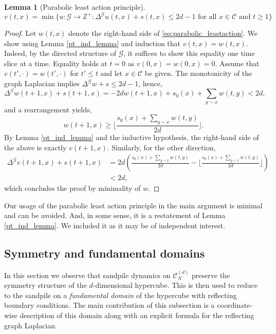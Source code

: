 \documentclass[12pt]{amsart}
\newtheorem{lemma}[theorem]{Lemma}
\begin{document}
	
	
	
	\begin{lemma}[Parabolic least action principle] \label{parabolic_comparison}
		\begin{equation} \label{eq:parabolic_leastaction}
		v(t,x) = \min\{ u: \mathcal{G} \to \mathbb{Z}^+: \Delta^{\mathcal{G}} u(t,x) + s(t,x) \leq 2d-1 \mbox{ for all $x \in \mathcal{C}$ and $t \geq 1$} \}
		\end{equation}
	\end{lemma}
	\begin{proof}
		Let $w(t,x)$ denote the right-hand side of \eqref{eq:parabolic_leastaction}. We show using Lemma \ref{pt_ind_lemma} and induction that $v(t,x) = w(t,x)$. Indeed, by the directed structure of $\mathcal{G}$, it suffices to show this equality one time slice at a time. Equality holds at $t=0$ as $v(0,x) = w(0,x) = 0$. Assume that $v(t',\cdot) = w(t', \cdot)$ for $t' \leq t$ and let $x \in \mathcal{C}$ be given. 
		The monotonicity of the graph Laplacian implies $\Delta^{\mathcal{G}} w + s \leq 2 d- 1$, hence, 
		\[
		\Delta^{\mathcal{G}} w(t+1,x) + s(t+1,x) = -2d w(t+1,x) + s_0(x) + \sum_{y\sim x} w(t,y) < 2d, 
		\]
		and a rearrangement yields, 
		\[
		w(t+1,x) \geq \lfloor \frac{s_0(x) + \sum_{y\sim x} w(t,y)}{2d} \rfloor. 
		\]
		By Lemma \ref{pt_ind_lemma} and the inductive hypothesis, the right-hand side of the above is exactly $v(t+1,x)$. Similarly, for the other direction, 
		\begin{align*}
		\Delta^{\mathcal{G}} v(t+1,x) + s(t+1,x) &=  2 d \left( \frac{s_0(x) + \sum_{y\sim x} w(t,y)}{2d} - \lfloor \frac{s_0(x) + \sum_{y\sim x} w(t,y)}{2d} \rfloor \right) \\
		&< 2d,
		\end{align*}
		which concludes the proof by minimality of $w$. 
	\end{proof}
	\noindent  
	Our usage of the parabolic least action principle in the main argument is minimal
	and can be avoided. And, in some sense, it is a restatement of Lemma \ref{pt_ind_lemma}. We included it as it may be of independent interest. 
	
	\subsection{Symmetry and fundamental domains} \label{subsec:symmetry}
	In this section we observe that sandpile dynamics on $\mathcal{C}_N^{(d)}$ preserve the symmetry structure of the $d$-dimensional hypercube.
	This is then used to reduce to the sandpile on a {\it fundamental domain} of the hypercube with reflecting boundary conditions.  The main contribution 
	of this subsection is a coordinate-wise description of this domain along with an explicit formula for the reflecting graph Laplacian. 
	
\end{document}
